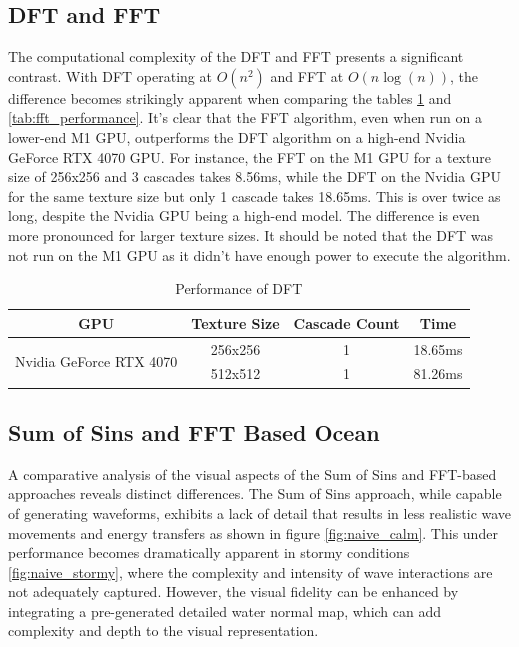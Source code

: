 \subsection{DFT and FFT}
The computational complexity of the DFT and FFT presents a significant contrast. With DFT operating at $O(n^2)$ and FFT at $O(n\log(n))$, the difference becomes strikingly apparent when comparing the tables \ref{tab:dft_ocean} and \ref{tab:fft_performance}. It's clear that the FFT algorithm, even when run on a lower-end M1 GPU, outperforms the DFT algorithm on a high-end Nvidia GeForce RTX 4070 GPU. For instance, the FFT on the M1 GPU for a texture size of 256x256 and 3 cascades takes 8.56ms, while the DFT on the Nvidia GPU for the same texture size but only 1 cascade takes 18.65ms. This is over twice as long, despite the Nvidia GPU being a high-end model. The difference is even more pronounced for larger texture sizes. It should be noted that the DFT was not run on the M1 GPU as it didn't have enough power to execute the algorithm.

\begin{table}[h]
    \centering
    \begin{tabular}{cccc}
        \toprule
        \textbf{GPU} & \textbf{Texture Size} & \textbf{Cascade Count} & \textbf{Time} \\
        \midrule
        \multirow{2}{*}{Nvidia GeForce RTX 4070} & 256x256 & 1 & 18.65ms \\
                                                  & 512x512 & 1 & 81.26ms \\
        \bottomrule
    \end{tabular}
    \caption{Performance of DFT}
    \label{tab:dft_ocean}
\end{table}

\subsection{Sum of Sins and FFT Based Ocean}
A comparative analysis of the visual aspects of the Sum of Sins and FFT-based approaches reveals distinct differences. The Sum of Sins approach, while capable of generating waveforms, exhibits a lack of detail that results in less realistic wave movements and energy transfers as shown in figure \ref{fig:naive_calm}. This under performance becomes dramatically apparent in stormy conditions \ref{fig:naive_stormy}, where the complexity and intensity of wave interactions are not adequately captured. However, the visual fidelity can be enhanced by integrating a pre-generated detailed water normal map, which can add complexity and depth to the visual representation.

